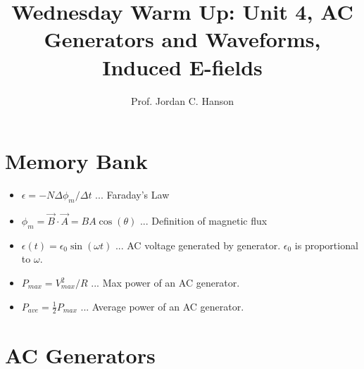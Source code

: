 \documentclass{article}
\begin{document}
\twocolumn

\title{Wednesday Warm Up: Unit 4, AC Generators and Waveforms, Induced E-fields}
\author{Prof. Jordan C. Hanson}

\maketitle

\section{Memory Bank}

\begin{itemize}
\item $\epsilon = -N \Delta \phi_m /\Delta t$ ... Faraday's Law
\item $\phi_m = \vec{B} \cdot \vec{A} = BA \cos(\theta)$ ... Definition of magnetic flux
\item $\epsilon(t) = \epsilon_0 \sin(\omega t)$ ... AC voltage generated by generator.  $\epsilon_0$ is proportional to $\omega$.
\item $P_{max} = V_{max}^2/R$ ... Max power of an AC generator.
\item $P_{ave} = \frac{1}{2} P_{max}$ ... Average power of an AC generator.
\end{itemize}

\section{AC Generators}
\end{document}
